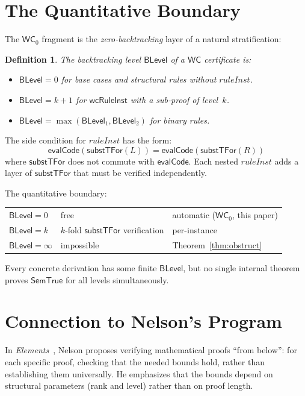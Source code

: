 \documentclass[11pt]{article}
\newtheorem{definition}[theorem]{Definition}
\newcommand{\WC}{\mathsf{WC}}
\newcommand{\WCz}{\mathsf{WC}_0}
\newcommand{\SemTrue}{\mathsf{SemTrue}}
\newcommand{\evalCode}{\mathsf{evalCode}}
\newcommand{\substTFor}{\mathsf{substTFor}}
\newcommand{\BLevel}{\mathsf{BLevel}}
\begin{document}
\section{The Quantitative Boundary}

The $\WCz$ fragment is the \emph{zero-backtracking} layer of a natural
stratification:

\begin{definition}
The \emph{backtracking level} $\BLevel$ of a $\WC$ certificate is:
\begin{itemize}
\item $\BLevel = 0$ for base cases and structural rules without $\mathit{ruleInst}$.
\item $\BLevel = k{+}1$ for $\mathsf{wcRuleInst}$ with a sub-proof of level~$k$.
\item $\BLevel = \max(\BLevel_1, \BLevel_2)$ for binary rules.
\end{itemize}
\end{definition}

The side condition for $\mathit{ruleInst}$ has the form:
\[
  \evalCode(\substTFor(L)) = \evalCode(\substTFor(R))
\]
where $\substTFor$ does not commute with $\evalCode$.
Each nested $\mathit{ruleInst}$ adds a layer of $\substTFor$
that must be verified independently.

The quantitative boundary:
\begin{center}
\begin{tabular}{lll}
$\BLevel = 0$ & free & automatic ($\WCz$, this paper) \\
$\BLevel = k$ & $k$-fold $\substTFor$ verification & per-instance \\
$\BLevel = \infty$ & impossible & Theorem~\ref{thm:obstruct}
\end{tabular}
\end{center}

Every concrete derivation has some finite $\BLevel$, but no single
internal theorem proves $\SemTrue$ for all levels simultaneously.

\section{Connection to Nelson's Program}

In \emph{Elements}~\cite{nelson2015}, Nelson proposes verifying
mathematical proofs ``from below'': for each specific proof, checking
that the needed bounds hold, rather than establishing them universally.
He emphasizes that the bounds depend on structural parameters (rank and
level) rather than on proof length.
\end{document}

